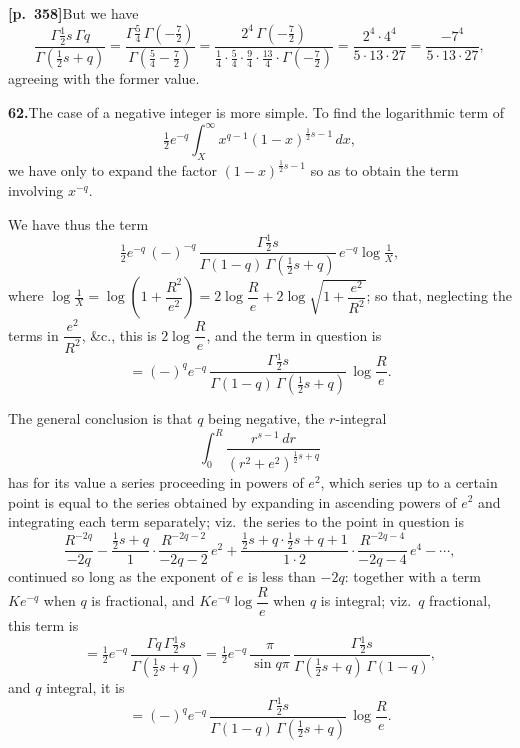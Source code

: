 \documentclass[11pt]{article}
\begin{document}
\bigskip

\noindent\textbf{[p.~358]}\quad But we have
\[
\frac{\Gamma\tfrac{1}{2}s\,\Gamma q}{\Gamma(\tfrac{1}{2}s+q)}
= \frac{\Gamma\tfrac{5}{4}\,\Gamma(-\tfrac{7}{2})}{\Gamma(\tfrac{5}{4}-\tfrac{7}{2})}
= \frac{2^{4}\,\Gamma(-\tfrac{7}{2})}{\tfrac{1}{4}\cdot\tfrac{5}{4}\cdot\tfrac{9}{4}\cdot\tfrac{13}{4}\cdot\Gamma(-\tfrac{7}{2})}
= \frac{2^{4}\cdot 4^{4}}{5\cdot 13\cdot 27} = \frac{-7^{4}}{5\cdot 13\cdot 27},
\]
agreeing with the former value.

\bigskip

\noindent\textbf{62.}\quad The case of a negative integer is more simple. To find the logarithmic term of
\[
\tfrac{1}{2}e^{-q}\int_{X}^{\infty} x^{q-1}(1-x)^{\frac{1}{2}s-1}\,dx,
\]
we have only to expand the factor $(1-x)^{\frac{1}{2}s-1}$ so as to obtain the term involving $x^{-q}$.

We have thus the term
\[
\tfrac{1}{2}e^{-q}\,(-)^{-q}\,\frac{\Gamma\tfrac{1}{2}s}{\Gamma(1-q)\,\Gamma(\tfrac{1}{2}s+q)}\,e^{-q}\log\tfrac{1}{X},
\]
where $\log\tfrac{1}{X} = \log\left(1+\dfrac{R^{2}}{e^{2}}\right) = 2\log\dfrac{R}{e} + 2\log\sqrt{1+\dfrac{e^{2}}{R^{2}}}$; so that, neglecting the terms in $\dfrac{e^{2}}{R^{2}}$, \&c., this is $2\log\dfrac{R}{e}$, and the term in question is
\[
= (-)^{q}e^{-q}\,\frac{\Gamma\tfrac{1}{2}s}{\Gamma(1-q)\,\Gamma(\tfrac{1}{2}s+q)}\,\log\frac{R}{e}.
\]

The general conclusion is that $q$ being negative, the $r$-integral
\[
\int_{0}^{R}\frac{r^{s-1}\,dr}{(r^{2}+e^{2})^{\frac{1}{2}s+q}}
\]
has for its value a series proceeding in powers of $e^{2}$, which series up to a certain point is equal to the series obtained by expanding in ascending powers of $e^{2}$ and integrating each term separately; viz.\ the series to the point in question is
\[
\frac{R^{-2q}}{-2q} - \frac{\tfrac{1}{2}s+q}{1}\cdot\frac{R^{-2q-2}}{-2q-2}\,e^{2}
+ \frac{\tfrac{1}{2}s+q\cdot\tfrac{1}{2}s+q+1}{1\cdot 2}\cdot\frac{R^{-2q-4}}{-2q-4}\,e^{4} - \cdots,
\]
continued so long as the exponent of $e$ is less than $-2q$: together with a term $Ke^{-q}$ when $q$ is fractional, and $Ke^{-q}\log\dfrac{R}{e}$ when $q$ is integral; viz.\ $q$ fractional, this term is
\[
= \tfrac{1}{2}e^{-q}\,\frac{\Gamma q\,\Gamma\tfrac{1}{2}s}{\Gamma(\tfrac{1}{2}s+q)}
= \tfrac{1}{2}e^{-q}\,\frac{\pi}{\sin q\pi}\,\frac{\Gamma\tfrac{1}{2}s}{\Gamma(\tfrac{1}{2}s+q)\,\Gamma(1-q)},
\]
and $q$ integral, it is
\[
= (-)^{q}e^{-q}\,\frac{\Gamma\tfrac{1}{2}s}{\Gamma(1-q)\,\Gamma(\tfrac{1}{2}s+q)}\,\log\frac{R}{e}.
\]
\end{document}
